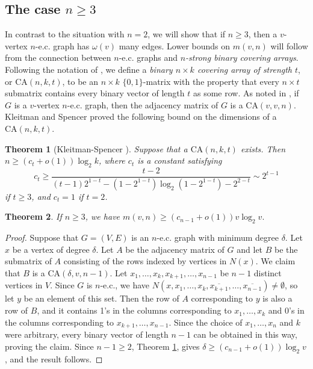 \documentclass{article}
\newtheorem{thm}{Theorem}
\theoremstyle{definition}
\begin{document}
\subsection{The case $n\ge 3$}

In contrast to the situation with $n=2$, we will show that if $n\ge 3$, then a $v$-vertex $n$-e.c. graph has $\omega(v)$ many edges. Lower bounds on $m(v,n)$ will follow from the connection between $n$-e.c. graphs and $n$\textit{-strong binary covering arrays}. Following the notation of \cite{lawrence2011survey}, we define a \textit{binary $n\times k$ covering array of strength $t$}, or $\mathrm{CA}(n,k,t)$, to be an $n\times k$ $\{0,1\}$-matrix with the property that every $n\times t$ submatrix contains every binary vector of length $t$ as some row. As noted in \cite{colbourn2009binary}, if $G$ is a $v$-vertex $n$-e.c. graph, then the adjacency matrix of $G$ is a $\mathrm{CA}(v,v,n)$. Kleitman and Spencer \cite{kleitman1973families} proved the following bound on the dimensions of a $\mathrm{CA}(n,k,t)$.

\begin{thm}[Kleitman-Spencer \cite{kleitman1973families}] \label{Theorem Kleitman Spencer} Suppose that a $\mathrm{CA}(n,k,t)$ exists. Then $n\ge (c_t+o(1))\log_2k$, where $c_t$ is a constant satisfying
$$c_t\ge\frac{t-2}{(t-1){2^{1-t}}-(1-2^{1-t})\log_2(1-2^{1-t})-2^{2-t}}\sim 2^{t-1}$$
if $t\ge 3$, and $c_t=1$ if $t=2$.
\end{thm}

\begin{thm} \label{Theorem n>2 lower bound}
    If $n\ge 3$, we have $m(v,n)\ge (c_{n-1}+o(1))v\log_2 v.$
\end{thm}
\begin{proof}
    Suppose that $G=(V,E)$ is an $n$-e.c. graph with minimum degree $\delta$. Let $x$ be a vertex of degree $\delta$. Let $A$ be the adjacency matrix of $G$ and let $B$ be the submatrix of $A$ consisting of the rows indexed by vertices in $N(x)$. We claim that $B$ is a $\mathrm{CA}(\delta,v,n-1)$. Let $x_1,\ldots,x_k,x_{k+1},\ldots,x_{n-1}$ be $n-1$ distinct vertices in $V$. Since $G$ is $n$-e.c., we have $N(x,x_1,\ldots,x_k,\overline{x_{k+1}},\ldots,\overline{x_{n-1}})\ne\emptyset$, so let $y$ be an element of this set. Then the row of $A$ corresponding to $y$ is also a row of $B$, and it contains 1's in the columns corresponding to $x_1,\ldots,x_k$ and 0's in the columns corresponding to $x_{k+1},\ldots,x_{n-1}$. Since the choice of $x_1,\ldots,x_n$ and $k$ were arbitrary, every binary vector of length $n-1$ can be obtained in this way, proving the claim. Since $n-1\ge 2$, Theorem \ref{Theorem Kleitman Spencer}, gives $\delta\ge (c_{n-1}+o(1))\log_2v$, and the result follows.
\end{proof}
\end{document}
